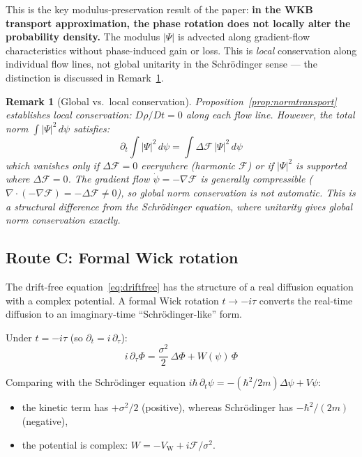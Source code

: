 \documentclass[12pt]{article}
\newtheorem{remark}[theorem]{Remark}
\newcommand{\Fcal}{\mathcal{F}}
\begin{document}
This is the key modulus-preservation result of the paper: \textbf{in the WKB transport approximation, the phase rotation does not locally alter the probability density.} The modulus $|\Psi|$ is advected along gradient-flow characteristics without phase-induced gain or loss. This is \textit{local} conservation along individual flow lines, not global unitarity in the Schr\"odinger sense --- the distinction is discussed in Remark~\ref{rem:global}.

\begin{remark}[Global vs.\ local conservation]\label{rem:global}
Proposition~\ref{prop:normtransport} establishes \textit{local} conservation: $D\rho/Dt = 0$ along each flow line. However, the total norm $\int |\Psi|^2\, d\psi$ satisfies:
\begin{equation}
    \partial_t \int |\Psi|^2\, d\psi = \int \Delta\Fcal\, |\Psi|^2\, d\psi
\end{equation}
which vanishes only if $\Delta\Fcal = 0$ everywhere (harmonic $\Fcal$) or if $|\Psi|^2$ is supported where $\Delta\Fcal = 0$. The gradient flow $\dot\psi = -\nabla\Fcal$ is generally compressible ($\nabla \cdot (-\nabla\Fcal) = -\Delta\Fcal \neq 0$), so global norm conservation is \textit{not} automatic. This is a structural difference from the Schr\"odinger equation, where unitarity gives global norm conservation exactly.
\end{remark}

\subsection{Route C: Formal Wick rotation}\label{sec:routeC}

The drift-free equation~\eqref{eq:driftfree} has the structure of a real diffusion equation with a complex potential. A formal Wick rotation $t \to -i\tau$ converts the real-time diffusion to an imaginary-time ``Schr\"odinger-like'' form.

Under $t = -i\tau$ (so $\partial_t = i\,\partial_\tau$):
\begin{equation}\label{eq:wick}
    i\,\partial_\tau \Phi = \frac{\sigma^2}{2}\,\Delta\Phi + W(\psi)\,\Phi
\end{equation}

Comparing with the Schr\"odinger equation $i\hbar\,\partial_t\psi = -(\hbar^2/2m)\Delta\psi + V\psi$:
\begin{itemize}
    \item the kinetic term has $+\sigma^2/2$ (positive), whereas Schr\"odinger has $-\hbar^2/(2m)$ (negative),
    \item the potential is complex: $W = -V_{\mathrm{W}} + i\Fcal/\sigma^2$.
\end{itemize}
\end{document}
